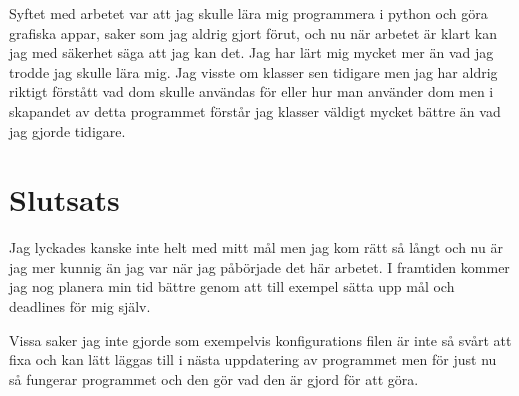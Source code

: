 \documentclass[a4paper, 12pt]{article}
\begin{document}
Syftet med arbetet var att jag skulle lära mig programmera i python och göra grafiska appar, saker som jag aldrig gjort förut, och nu när arbetet är klart kan jag med säkerhet säga att jag kan det. Jag har lärt mig mycket mer än vad jag trodde jag skulle lära mig. Jag visste om klasser sen tidigare men jag har aldrig riktigt förstått vad dom skulle användas för eller hur man använder dom men i skapandet av detta programmet förstår jag klasser väldigt mycket bättre än vad jag gjorde tidigare.


\section{Slutsats}

Jag lyckades kanske inte helt med mitt mål men jag kom rätt så långt och nu är jag mer kunnig än jag var när jag påbörjade det här arbetet.
I framtiden kommer jag nog planera min tid bättre genom att till exempel sätta upp mål och deadlines för mig själv.

Vissa saker jag inte gjorde som exempelvis konfigurations filen är inte så svårt att fixa och kan lätt läggas till i nästa uppdatering av programmet men för just nu så fungerar programmet och den gör vad den är gjord för att göra.  


\newpage 

%

\printbibliography
\end{document}
